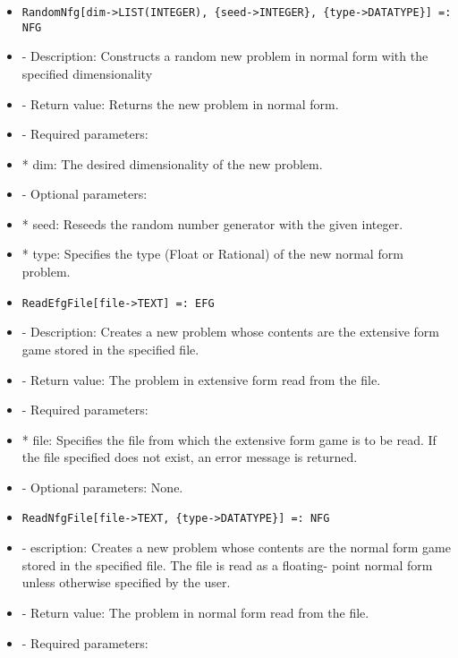 \begin{itemize}
\item

\begin{verbatim}
RandomNfg[dim->LIST(INTEGER), {seed->INTEGER}, {type->DATATYPE}] =: NFG
\end{verbatim}

\bd
\item
- Description:  Constructs a random new problem in normal form with the 
specified dimensionality
\item
- Return value:  Returns the new problem in normal form.
\item
- Required parameters:
	
\bd
\item
*  dim:  The desired dimensionality of the new problem.
\ed

\item
- Optional parameters:
	
\bd
\item
*  seed:  Reseeds the random number generator with the given integer.
\item

*  type:  Specifies the type (Float or Rational) of the new normal 
form problem.
\ed
\ed

\item
\begin{verbatim}
ReadEfgFile[file->TEXT] =: EFG
\end{verbatim}

\bd
\item
- Description:  Creates a new problem whose contents are the extensive 
form game stored in the specified file.
\item
- Return value:  The problem in extensive form read from the file.
\item

- Required parameters:

\bd
\item
*  file:  Specifies the file from which the extensive form game is to
be read.  If the file specified does not exist, an error 
message is returned.
\ed

\item
- Optional parameters:  None.
\ed

\item
\begin{verbatim}
ReadNfgFile[file->TEXT, {type->DATATYPE}] =: NFG
\end{verbatim}

\bd
\item
- escription:  Creates a new problem whose contents are the normal form
game stored in the specified file.  The file is read as a floating-
point normal form unless otherwise specified by the user.
\item
- Return value:  The problem in normal form read from the file.
\item
- Required parameters:


\end{itemize}

